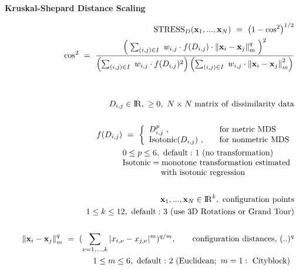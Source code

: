 \documentclass[12pt]{article}
\begin{document}
\newcommand{\Reals}   {{\rm I \! R}}
\newcommand{\vx}      {{\mbox{\bf x}}}

\begin{center}
{\Large \bf Kruskal-Shepard Distance Scaling}
\end{center}

\begin{eqnarray*}
&& {\rm STRESS}_D(\vx_1,...,\vx_N) ~=~ \left( 1 - \cos^2 \right)^{1/2}
\\
&& ~~~~~~~~ 
\cos^2 ~=~ 
    \frac{ 
      \left( \; 
        \sum_{ (i,j) \in I } ~
          w_{i,j} \cdot f(D_{i,j}) \cdot {\| \vx_i - \vx_j \|}_m^q
      \; \right)^2
    }{
      \left( \sum_{ (i,j) \in I } ~w_{i,j} \cdot f(D_{i,j})^2 \right) 
      \left( \sum_{ (i,j) \in I } ~w_{i,j} \cdot {\| \vx_i - \vx_j \|}_m^2 \right)
    }
\\
~
\\
~
\\
&& D_{i,j} \in \Reals,~ \ge 0, ~ N \times N ~ {\rm matrix~of~dissimilarity~data}
\\
~
\\
&& f(D_{i,j}) ~=~ \left\{ \begin{array}{ll}
                  D_{i,j}^p~,               ~~~& {\rm for~metric~MDS}
                  \\
                  {\rm Isotonic}(D_{i,j})~, ~~~& {\rm for~nonmetric~MDS}
                  \end{array} \right.
\\
&& ~~~~~~~~~~~~~~~
\begin{array}{l}
0 \le p \le 6, ~{\rm default:}~1~({\rm no~transformation}) \\
{\rm Isotonic} = {\rm monotone~transformation~estimated} \\
{\rm ~~~~~~~~~~~~~~ with~isotonic~regression}
\end{array}
\\
~
\\
&& \vx_1,...,\vx_N \in \Reals^k, ~ {\rm configuration~points} 
\\
&& ~~~~~~~~~~~~~~~~~
1 \le k \le 12, ~{\rm default:}~3~({\rm use~3D~Rotations~or~Grand~Tour})
\\
~
\\
&& {\| \vx_i - \vx_j \|}_m^q ~=~ 
   ( \sum_{\nu=1,...,k} | x_{i,\nu} - x_{j,\nu} |^m )^{q/m},
~~~~~~
{\rm configuration~distances,}~(..)^q
\\
&& ~~~~~~~~~~~~~~~
\begin{array}{l}
1 \le m \le 6, ~{\rm default:}~2~({\rm Euclidean};~ m=1:~{\rm City block})

\end{array}
\end{eqnarray*}
\end{document}

